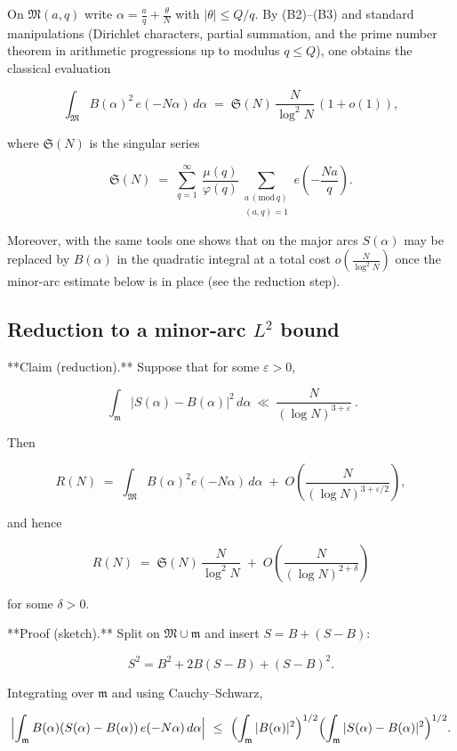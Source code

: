 \documentclass[11pt]{article}
\theoremstyle{definition}
\theoremstyle{remark}
\begin{document}
On $\mathfrak M(a,q)$ write $\alpha=\tfrac{a}{q}+\tfrac{\theta}{N}$ with
$|\theta|\le Q/q$. By (B2)–(B3) and standard manipulations (Dirichlet characters, partial summation, and the prime number theorem in arithmetic progressions up to modulus $q\le Q$), one obtains the classical evaluation

$$
\int_{\mathfrak M} B(\alpha)^2\,e(-N\alpha)\,d\alpha
\;=\;\mathfrak S(N)\,\frac{N}{\log^2 N}\,(1+o(1)),
$$

where $\mathfrak S(N)$ is the singular series

$$
\mathfrak S(N)\;=\;\sum_{q=1}^{\infty}\ \frac{\mu(q)}{\varphi(q)}\!
\sum_{\substack{a\,(\mathrm{mod}\,q)\\(a,q)=1}} e\!\left(-\frac{Na}{q}\right).
$$

Moreover, with the same tools one shows that on the major arcs $S(\alpha)$ may be replaced by $B(\alpha)$ in the quadratic integral at a total cost $o\!\left(\tfrac{N}{\log^2 N}\right)$ once the minor-arc estimate below is in place (see the reduction step).


\subsection*{Reduction to a minor-arc $L^2$ bound}

**Claim (reduction).** Suppose that for some $\varepsilon>0$,

\begin{equation}
\boxed{\ \ \int_{\mathfrak m}\!\bigl|S(\alpha)-B(\alpha)\bigr|^{2}\,d\alpha
\ \ll\ \frac{N}{(\log N)^{3+\varepsilon}}\ .\ }
\tag{A.1}
\end{equation}


Then

$$
R(N)\;=\;\int_{\mathfrak M} B(\alpha)^2 e(-N\alpha)\,d\alpha\;+\;O\!\left(\frac{N}{(\log N)^{3+\varepsilon/2}}\right),
$$

and hence

$$
R(N)\;=\;\mathfrak S(N)\,\frac{N}{\log^{2}N}\;+\;O\!\left(\frac{N}{(\log N)^{2+\delta}}\right)
$$

for some $\delta>0$.

**Proof (sketch).** Split on $\mathfrak M\cup\mathfrak m$ and insert $S=B+(S-B)$:

$$
S^2 = B^2 + 2B(S-B) + (S-B)^2.
$$

Integrating over $\mathfrak m$ and using Cauchy–Schwarz,

$$
\Bigl|\int_{\mathfrak m} B(\alpha)(S(\alpha)-B(\alpha))\,e(-N\alpha)\,d\alpha\Bigr|
\ \le\ \Bigl(\int_{\mathfrak m}|B(\alpha)|^2\Bigr)^{1/2}
      \Bigl(\int_{\mathfrak m}|S(\alpha)-B(\alpha)|^2\Bigr)^{1/2}.
$$
\end{document}

